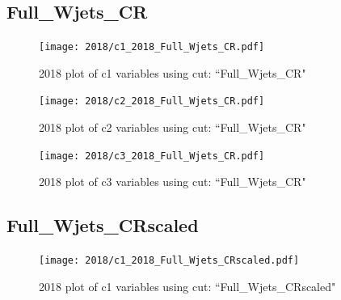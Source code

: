 \documentclass{article}
\begin{document}
      \subsection*{Full\_Wjets\_CR}
                        \begin{figure}[H]
                            \centering
                            \caption{2018 plot of c1 variables using cut: ``Full\_Wjets\_CR"}
                            \texttt{[image: 2018/c1\_2018\_Full\_Wjets\_CR.pdf]}
                        \end{figure}    
                        \begin{figure}[H]
                            \centering
                            \caption{2018 plot of c2 variables using cut: ``Full\_Wjets\_CR"}
                            \texttt{[image: 2018/c2\_2018\_Full\_Wjets\_CR.pdf]}
                        \end{figure}    
                        \begin{figure}[H]
                            \centering
                            \caption{2018 plot of c3 variables using cut: ``Full\_Wjets\_CR"}
                            \texttt{[image: 2018/c3\_2018\_Full\_Wjets\_CR.pdf]}
                        \end{figure}    
      \subsection*{Full\_Wjets\_CRscaled}
                        \begin{figure}[H]
                            \centering
                            \caption{2018 plot of c1 variables using cut: ``Full\_Wjets\_CRscaled"}
                            \texttt{[image: 2018/c1\_2018\_Full\_Wjets\_CRscaled.pdf]}
                        \end{figure}    
\end{document}
